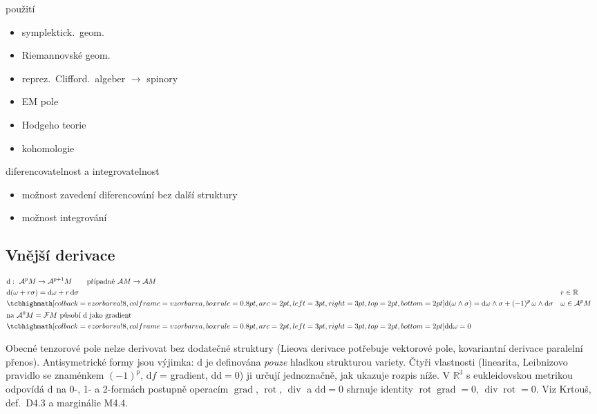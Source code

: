 použití
\begin{itemize}[nosep]
  \item[] symplektick.\ geom.
  \item[] Riemannovské geom.
  \item[] reprez.\ Clifford.\ algeber $\to$ spinory
  \item[] EM pole
  \item[] Hodgeho teorie
  \item[] kohomologie
\end{itemize}
diferencovatelnost a integrovatelnost
\begin{itemize}[nosep]
  \item[] možnost zavedení diferencování bez další struktury
  \item[] možnost integrování
\end{itemize}

\subsection{Vnější derivace}

\begin{definice}
\begin{align*}
  &\mathrm{d}:\ \mathcal{A}^pM \to \mathcal{A}^{p+1}M \qquad \text{případně } \mathcal{A}M\to\mathcal{A}M \\
  &\mathrm{d}(\omega + r\sigma) = \mathrm{d}\omega + r\,\mathrm{d}\sigma && r\in\mathbb{R} \\
  &\vzorec{\mathrm{d}(\omega\wedge\sigma) = \mathrm{d}\omega\wedge\sigma + (-1)^p\,\omega\wedge\mathrm{d}\sigma} && \omega\in\mathcal{A}^pM \\
  &\text{na } \mathcal{A}^0M = \mathcal{F}M \text{ působí } \mathrm{d} \text{ jako gradient} \\
  &\vzorec{\mathrm{d}\mathrm{d}\omega = 0}
\end{align*}
\end{definice}

\begin{vysvetleni}
Obecné tenzorové pole nelze derivovat bez dodatečné struktury (Lieova derivace potřebuje vektorové pole, kovariantní derivace paralelní přenos). Antisymetrické formy jsou výjimka: $\mathrm{d}$ je definována \emph{pouze} hladkou strukturou variety. Čtyři vlastnosti (linearita, Leibnizovo pravidlo se znaménkem $(-1)^p$, $\mathrm{d}f$ = gradient, $\mathrm{d}\mathrm{d}=0$) ji určují jednoznačně, jak ukazuje rozpis níže.
V $\mathbb{R}^3$ s eukleidovskou metrikou odpovídá $\mathrm{d}$ na 0-, 1- a 2-formách postupně operacím $\operatorname{grad}$, $\operatorname{rot}$, $\operatorname{div}$ a $\mathrm{d}\mathrm{d}=0$ shrnuje identity $\operatorname{rot}\operatorname{grad}=0$, $\operatorname{div}\operatorname{rot}=0$.
Viz Krtouš, def.~D4.3 a marginálie M4.4.
\end{vysvetleni}

